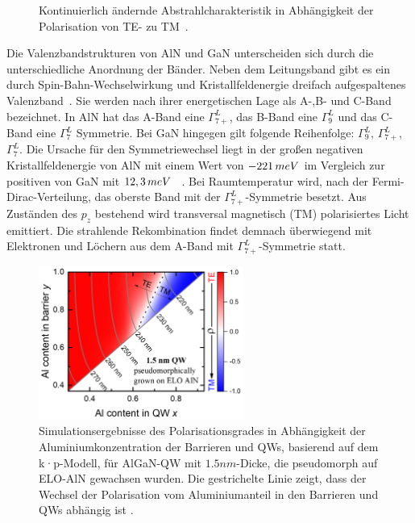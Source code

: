 \begin{figure}[H]
\begin{minipage}[t]{0.49\linewidth}
        \caption{Kontinuierlich ändernde Abstrahlcharakteristik in Abhängigkeit der Polarisation von TE- zu TM~\cite{martingut}.  }
        \label{fig:martintetm}
    \end{minipage}
\end{figure}
\vspace{0.1cm}
\noindent
Die Valenzbandstrukturen von AlN und GaN unterscheiden sich durch die unterschiedliche Anordnung der Bänder. Neben dem Leitungsband gibt es ein durch Spin-Bahn-Wechselwirkung und Kristallfeldenergie dreifach aufgespaltenes Valenzband~\cite{doi:10.1063/1.117689}. Sie werden nach ihrer energetischen Lage als A-,B- und C-Band bezeichnet. In AlN hat das A-Band eine $\Gamma^{L}_{7+}$, das B-Band eine $\Gamma^{L}_{9}$ und das C-Band eine $\Gamma^{L}_{7}$ Symmetrie. Bei GaN hingegen gilt folgende Reihenfolge:  $\Gamma^{L}_{9}$, $\Gamma^{L}_{7+}$, $\Gamma^{L}_{7}$. Die Ursache für den Symmetriewechsel liegt in der großen negativen Kristallfeldenergie von AlN mit einem Wert von $-221 \thinspace meV$ \cite{PhysRevB.87.235209} im Vergleich zur positiven von GaN mit $12,3 \thinspace meV$ ~\cite{PhysRevB.81.155202}. Bei Raumtemperatur wird, nach der Fermi-Dirac-Verteilung, das oberste Band mit der $\Gamma^{L}_{7+}$-Symmetrie besetzt. Aus Zuständen des $p_z$ bestehend wird transversal magnetisch (TM) polarisiertes Licht emittiert. Die strahlende Rekombination findet demnach überwiegend mit Elektronen und Löchern aus dem A-Band mit $\Gamma^{L}_{7+}$-Symmetrie statt.
\begin{figure}[htb]
  \centering
  \begin{minipage}{\linewidth}
      \centering
        \includegraphics[width=0.6\textwidth]{Bilder/christophPolarisationSimu.png}
      \caption{Simulationsergebnisse des Polarisationsgrades in Abhängigkeit der Aluminiumkonzentration der Barrieren und QWs, basierend auf
dem k·p-Modell, für AlGaN-QW mit $1.5nm$-Dicke, die pseudomorph auf ELO-AlN gewachsen wurden. Die gestrichelte Linie zeigt, dass der Wechsel der Polarisation vom Aluminiumanteil in den Barrieren und QWs abhängig ist \cite{doi:10.1063/1.4932651}.}
      \label{fig:simuchr}
  \end{minipage}
\end{figure}
